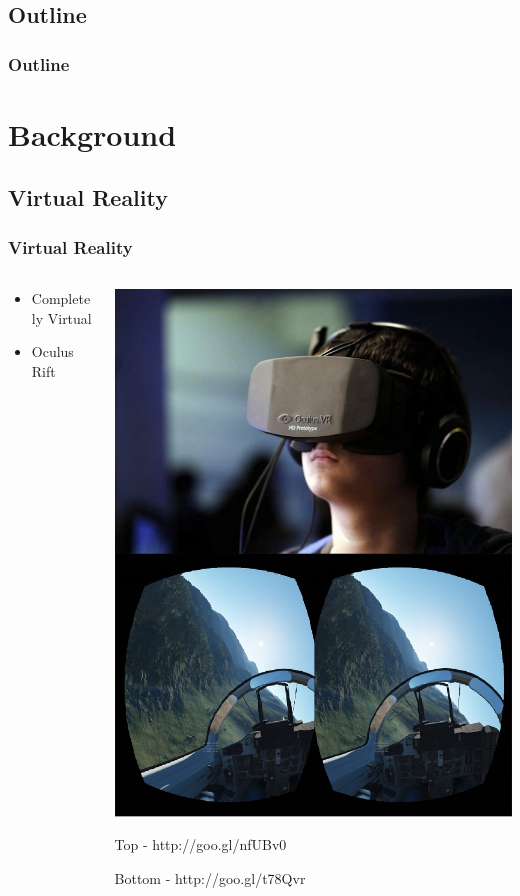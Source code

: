 \documentclass{beamer}
\begin{document}
\subsection*{Outline}
\begin{frame}
  \frametitle{Outline}
  \tableofcontents[hideallsubsections]
\end{frame}

\section{Background}

\subsection{Virtual Reality}
\begin{frame}
	\frametitle{Virtual Reality}
	\begin{columns}
    \begin{column}{0.4\textwidth}
	\begin{itemize}
		\item Completely Virtual
		\item Oculus Rift
	\end{itemize}
	\end{column}
	\begin{column}{0.4\textwidth}
	\includegraphics[width=\textwidth]{images/OculusRift}
	
	\tiny Top - http://goo.gl/nfUBv0
	
	Bottom - http://goo.gl/t78Qvr
	\end{column}
    \end{columns}
\end{frame}
\end{document}
